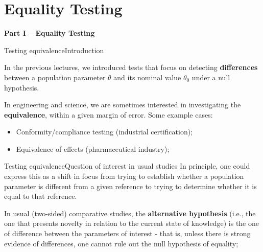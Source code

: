 


\section{Equality Testing}

\begin{frame}

  \begin{center}
    {\bf Part I -- Equality Testing}
  \end{center}

\end{frame}

\begin{frame}{Testing equivalence}{Introduction}

In the previous lectures, we introduced tests that focus on detecting {\bf differences} between a population parameter $\theta$ and its nominal value $\theta_0$ under a null hypothesis.\bigskip

In engineering and science, we are sometimes interested in investigating the {\bf equivalence}, within a given margin of error. Some example cases:\bigskip

\begin{itemize}
  \item Conformity/compliance testing (industrial certification);
  \item Equivalence of effects (pharmaceutical industry);
\end{itemize}
\end{frame}

\begin{frame}{Testing equivalence}{Question of interest in usual studies}
In principle, one could express this as a shift in focus from trying to establish whether a population parameter is different from a given reference to trying to determine whether it is equal to that reference.
\vfill

In usual (two-sided) comparative studies, the {\bf alternative hypothesis} (i.e., the one that presents novelty in relation to the current state of knowledge) is the one of difference between the parameters of interest - that is, unless there is strong evidence of differences, one cannot rule out the null hypothesis of equality;
\end{frame}


